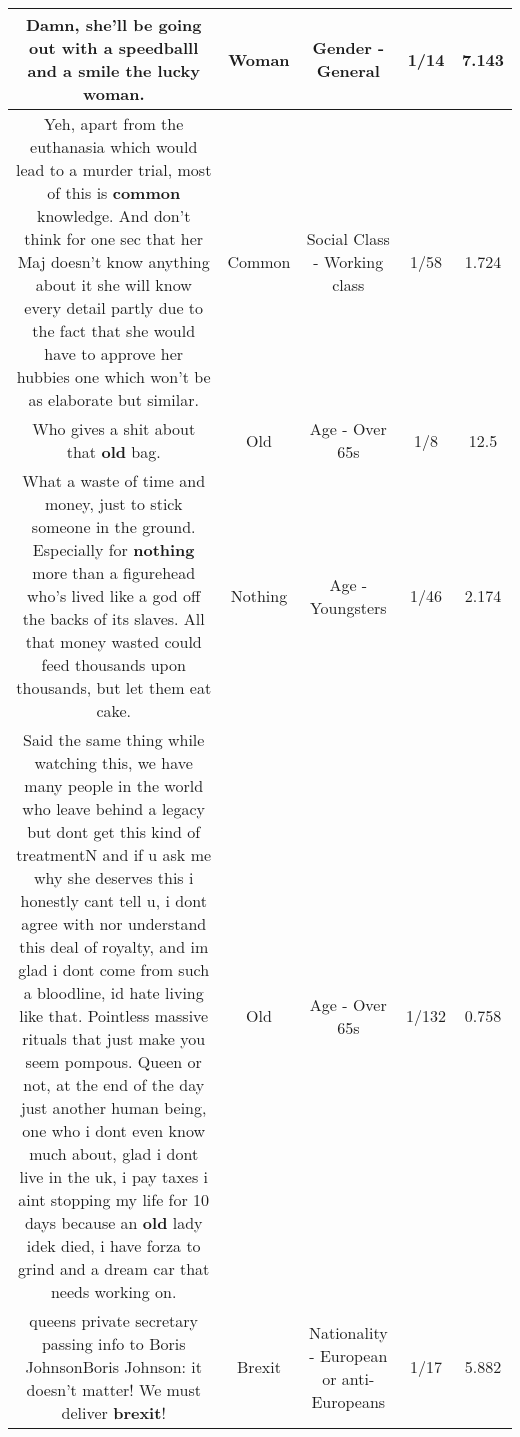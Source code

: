 \documentclass[11pt]{article}
\newlength\mylength
\begin{document}
\begin{center}
\begin{longtable}{|C{.65\mylength}|C{.30\mylength}|C{.12\mylength}|C{.12\mylength}|C{.12\mylength}|}
  \small Damn, she'll be going out with a speedballl and a smile the lucky \textbf{woman}.\normalsize   & Woman & Gender - General & 1/14 & 7.143 \\  \hline
  \small Yeh, apart from the euthanasia which would lead to a murder trial, most of this is \textbf{common} knowledge. And don't think for one sec that her Maj doesn't know anything about it she will know every detail partly due to the fact that she would have to approve her hubbies one which won't be as elaborate but similar.\normalsize   & Common & Social Class - Working class & 1/58 & 1.724 \\  \hline
  \small Who gives a shit about that \textbf{old} bag.\normalsize   & Old & Age - Over 65s & 1/8 & 12.5 \\  \hline
  \small What a waste of time and money, just to stick someone in the ground. Especially for \textbf{nothing} more than a figurehead who's lived like a god off the backs of its slaves. All that money wasted could feed thousands upon thousands, but let them eat cake.\normalsize   & Nothing & Age - Youngsters & 1/46 & 2.174 \\  \hline
  \small Said the same thing while watching this, we have many people in the world who leave behind a legacy but dont get this kind of treatmentN and if u ask me why she deserves this i honestly cant tell u, i dont agree with nor understand this deal of royalty, and im glad i dont come from such a bloodline, id hate living like that. Pointless massive rituals that just make you seem pompous. Queen or not, at the end of the day just another human being, one who i dont even know much about, glad i dont live in the uk, i pay taxes i aint stopping my life for 10 days because an \textbf{old} lady idek died, i have forza to grind and a dream car that needs working on.\normalsize   & Old & Age - Over 65s & 1/132 & 0.758 \\  \hline
  \small queens private secretary passing info to Boris JohnsonBoris Johnson: it doesn't matter! We must deliver \textbf{brexit}!\normalsize   & Brexit & Nationality - European or anti-Europeans & 1/17 & 5.882 \\  \hline

\end{longtable}
\end{center}
\end{document}
